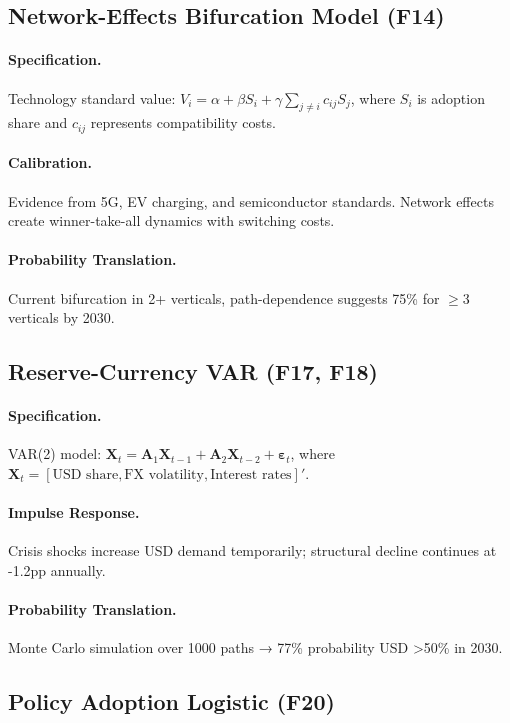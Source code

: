 \documentclass{article}
\begin{document}
\subsection{Network-Effects Bifurcation Model (F14)}
\paragraph{Specification.} Technology standard value: \( V_i = \alpha + \beta S_i + \gamma \sum_{j\neq i} c_{ij} S_j \), where \( S_i \) is adoption share and \( c_{ij} \) represents compatibility costs.
\paragraph{Calibration.} Evidence from 5G, EV charging, and semiconductor standards. Network effects create winner-take-all dynamics with switching costs.
\paragraph{Probability Translation.} Current bifurcation in 2+ verticals, path-dependence suggests 75\% for $\geq$3 verticals by 2030.

\subsection{Reserve-Currency VAR (F17, F18)}
\paragraph{Specification.} VAR(2) model: \( \mathbf{X}_t = \mathbf{A}_1 \mathbf{X}_{t-1} + \mathbf{A}_2 \mathbf{X}_{t-2} + \boldsymbol{\varepsilon}_t \), where \( \mathbf{X}_t = [\text{USD share}, \text{FX volatility}, \text{Interest rates}]' \).
\paragraph{Impulse Response.} Crisis shocks increase USD demand temporarily; structural decline continues at -1.2pp annually.
\paragraph{Probability Translation.} Monte Carlo simulation over 1000 paths → 77\% probability USD >50\% in 2030.

\subsection{Policy Adoption Logistic (F20)}\label{sec:policy-adopt}
\end{document}
